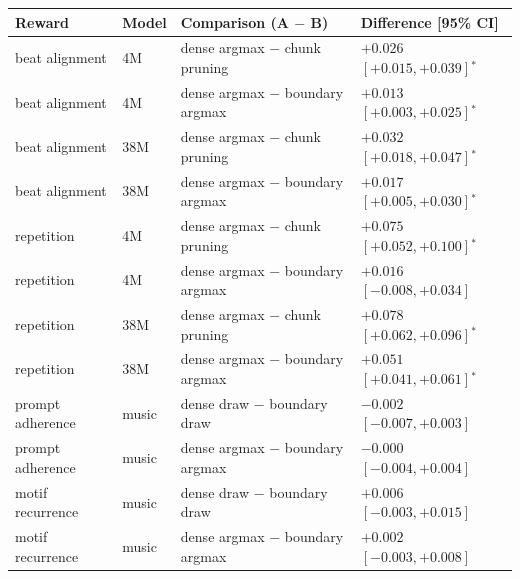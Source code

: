 \begin{tabular}{llll}
\toprule
Reward & Model & Comparison (A $-$ B) & Difference [95\% CI] \\
\midrule
beat alignment & 4M & dense argmax $-$ chunk pruning & $+0.026$ $[+0.015, +0.039]$$^*$ \\
beat alignment & 4M & dense argmax $-$ boundary argmax & $+0.013$ $[+0.003, +0.025]$$^*$ \\
beat alignment & 38M & dense argmax $-$ chunk pruning & $+0.032$ $[+0.018, +0.047]$$^*$ \\
beat alignment & 38M & dense argmax $-$ boundary argmax & $+0.017$ $[+0.005, +0.030]$$^*$ \\
repetition & 4M & dense argmax $-$ chunk pruning & $+0.075$ $[+0.052, +0.100]$$^*$ \\
repetition & 4M & dense argmax $-$ boundary argmax & $+0.016$ $[-0.008, +0.034]$ \\
repetition & 38M & dense argmax $-$ chunk pruning & $+0.078$ $[+0.062, +0.096]$$^*$ \\
repetition & 38M & dense argmax $-$ boundary argmax & $+0.051$ $[+0.041, +0.061]$$^*$ \\
prompt adherence & music & dense draw $-$ boundary draw & $-0.002$ $[-0.007, +0.003]$ \\
prompt adherence & music & dense argmax $-$ boundary argmax & $-0.000$ $[-0.004, +0.004]$ \\
motif recurrence & music & dense draw $-$ boundary draw & $+0.006$ $[-0.003, +0.015]$ \\
motif recurrence & music & dense argmax $-$ boundary argmax & $+0.002$ $[-0.003, +0.008]$ \\
\bottomrule
\end{tabular}
